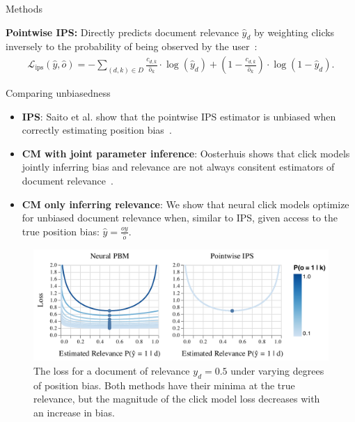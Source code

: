 \documentclass[final]{beamer}
\newlength{\onecolwid}
\begin{document}
\begin{frame}[t]
\begin{columns}[t]
\begin{column}{\onecolwid}
\begin{block}{Methods}
		\vspace{1ex}
		
		\textbf{Pointwise IPS:} Directly predicts document relevance $\hat{y}_d$ by weighting clicks inversely to the probability of being observed by the user~\cite{Saito2020PointwiseIPS}:
		\vspace{1ex}
		\begin{equation*}
			\begin{split}
			\mathcal{L}_{\text{ips}}(\hat{y}, \hat{o}) = - \sum_{(d,k) \in D} \frac{c_{d,k}}{\hat{o}_k} \cdot \log(\hat{y}_{d}) + (1 - \frac{c_{d,k}}{\hat{o}_k}) \cdot \log(1 - \hat{y}_{d}).
			\end{split}
		\end{equation*}

	\end{block}

	\vspace{1ex}
	
	\begin{alertblock}{Comparing unbiasedness}
		\vspace{1ex}

		\begin{itemize}
			\item \textbf{IPS}: Saito et al. show that the pointwise IPS estimator is unbiased when correctly estimating position bias~\cite{Saito2020PointwiseIPS}.
			\item \textbf{CM with joint parameter inference}: Oosterhuis shows that click models jointly inferring bias and relevance are not always consitent estimators of document relevance~\cite{Oosterhuis2022ULTRLimits}.
			\item \textbf{CM only inferring relevance}: \alert{We show that neural click models optimize for unbiased document relevance when, similar to IPS, given access to the true position bias}: $\hat{y} = \frac{o y}{\hat{o}}$.
		\end{itemize}

		\vspace{1ex}

		\begin{figure}[h]
			\includegraphics[width=1.\textwidth]{loss.pdf}
			\caption{The loss for a document of relevance $y_d = 0.5$ under varying degrees of position bias. Both methods have their minima at the true relevance, but the magnitude of the click model loss decreases with an increase in bias.}
		\end{figure}


\end{alertblock}
\end{column}
\end{columns}
\end{frame}
\end{document}
